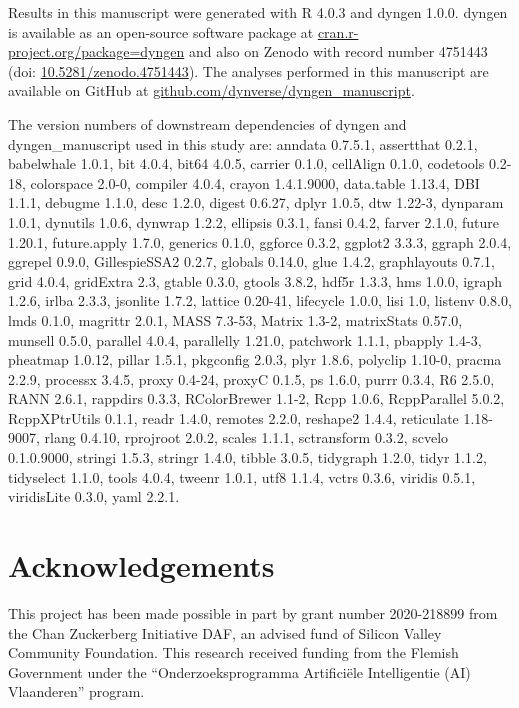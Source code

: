 \documentclass[10pt, a4paper]{article}
\begin{document}
Results in this manuscript were generated with R 4.0.3 and dyngen 1.0.0.
dyngen is available as an open-source software package at
\href{https://cran.r-project.org/package=dyngen}{cran.r-project.org/package=dyngen}
and also on Zenodo with record number 4751443 (doi:
\href{https://doi.org/10.5281/zenodo.4751443}{10.5281/zenodo.4751443}).
The analyses performed in this manuscript are available on GitHub at
\href{https://github.com/dynverse/dyngen_manuscript}{github.com/dynverse/dyngen\_manuscript}.

The version numbers of downstream dependencies of dyngen and
dyngen\_manuscript used in this study are: anndata 0.7.5.1, assertthat
0.2.1, babelwhale 1.0.1, bit 4.0.4, bit64 4.0.5, carrier 0.1.0,
cellAlign 0.1.0, codetools 0.2-18, colorspace 2.0-0, compiler 4.0.4,
crayon 1.4.1.9000, data.table 1.13.4, DBI 1.1.1, debugme 1.1.0, desc
1.2.0, digest 0.6.27, dplyr 1.0.5, dtw 1.22-3, dynparam 1.0.1, dynutils
1.0.6, dynwrap 1.2.2, ellipsis 0.3.1, fansi 0.4.2, farver 2.1.0, future
1.20.1, future.apply 1.7.0, generics 0.1.0, ggforce 0.3.2, ggplot2
3.3.3, ggraph 2.0.4, ggrepel 0.9.0, GillespieSSA2 0.2.7, globals 0.14.0,
glue 1.4.2, graphlayouts 0.7.1, grid 4.0.4, gridExtra 2.3, gtable 0.3.0,
gtools 3.8.2, hdf5r 1.3.3, hms 1.0.0, igraph 1.2.6, irlba 2.3.3,
jsonlite 1.7.2, lattice 0.20-41, lifecycle 1.0.0, lisi 1.0, listenv
0.8.0, lmds 0.1.0, magrittr 2.0.1, MASS 7.3-53, Matrix 1.3-2,
matrixStats 0.57.0, munsell 0.5.0, parallel 4.0.4, parallelly 1.21.0,
patchwork 1.1.1, pbapply 1.4-3, pheatmap 1.0.12, pillar 1.5.1, pkgconfig
2.0.3, plyr 1.8.6, polyclip 1.10-0, pracma 2.2.9, processx 3.4.5, proxy
0.4-24, proxyC 0.1.5, ps 1.6.0, purrr 0.3.4, R6 2.5.0, RANN 2.6.1,
rappdirs 0.3.3, RColorBrewer 1.1-2, Rcpp 1.0.6, RcppParallel 5.0.2,
RcppXPtrUtils 0.1.1, readr 1.4.0, remotes 2.2.0, reshape2 1.4.4,
reticulate 1.18-9007, rlang 0.4.10, rprojroot 2.0.2, scales 1.1.1,
sctransform 0.3.2, scvelo 0.1.0.9000, stringi 1.5.3, stringr 1.4.0,
tibble 3.0.5, tidygraph 1.2.0, tidyr 1.1.2, tidyselect 1.1.0, tools
4.0.4, tweenr 1.0.1, utf8 1.1.4, vctrs 0.3.6, viridis 0.5.1, viridisLite
0.3.0, yaml 2.2.1.

\hypertarget{acknowledgements}{%
	\section*{Acknowledgements}\label{acknowledgements}}

This project has been made possible in part by grant number 2020-218899
from the Chan Zuckerberg Initiative DAF, an advised fund of Silicon
Valley Community Foundation. This research received funding from the
Flemish Government under the ``Onderzoeksprogramma Artificiële
Intelligentie (AI) Vlaanderen'' program.
\end{document}
